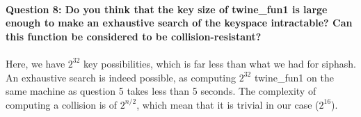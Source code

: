 \documentclass[4apaper]{report}
\begin{document}
\paragraph{Question 8: Do you think that the key size of twine\_fun1 is large enough to make an exhaustive search of
the keyspace intractable? Can this function be considered to be collision-resistant?}

\paragraph{} Here, we have $2^{32}$ key possibilities, which is far less than what we had for siphash. An exhaustive search is indeed possible, as computing $2^{32}$ twine\_fun1 on the same machine as question 5 takes less than 5 seconds. The complexity of computing a collision is of $2^{n/2}$, which mean that it is trivial in our case ($2^{16}$).
\end{document}
